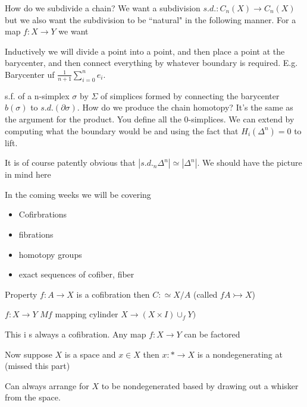 \documentclass[10pt]{article}
\theoremstyle{definition}
\begin{document}
	How do we subdivide a chain? We want a subdivision $s.d.:C_n(X)\to C_n(X)$ but we also want the subdivision to be ``natural" in the following manner. For a map $f:X\to Y$ we want \begin{center}
	\end{center}
	Inductively we will divide a point into a point, and then place a point at the barycenter, and then connect everything by whatever boundary is required. E.g. Barycenter uf $\frac{1}{n+1}\sum_{i=0}^n e_i$. 
	
	s.f. of a n-simplex $\sigma$ by $\Sigma$ of  simplices formed by connecting the barycenter $b(\sigma)$ to $s.d.(\partial \sigma)$. How do we produce the chain homotopy? It's the same as the argument for the product. You define all the $0$-simplices. We can extend by computing what the boundary would be and using the fact that $H_i(\Delta^n)=0$ to lift. 
	
	
	It is of course patently obvious that $|s.d._n\Delta^n|\simeq |\Delta^n|$. We should have the picture in mind here
	
	
	In the coming weeks we will be covering \begin{itemize}
		\item Cofirbrations
		\item fibrations
		\item homotopy groups
		\item exact sequences of cofiber, fiber
	\end{itemize}
	Property $f:A\to X$ is a cofibration then $C:\simeq X/A$ (called $f A\rightarrowtail X$)
	
	$f:X\to Y$ $Mf$ mapping cylinder $X\to (X\times I) \cup_f Y)$
	
	This i s always a cofibration.  Any map $f:X\to Y$ can be factored \begin{center}
	\end{center}
	Now suppose $X$ is a space and $x\in X$ then $x:\ast\to X$ is a nondegenerating at (missed this part)
	
	Can always arrange for $X$ to be nondegenerated based by drawing out a whisker from the space.
	
\end{document}
